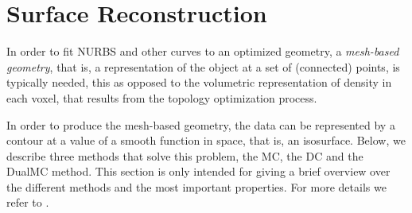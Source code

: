 \section{Surface Reconstruction}
\label{sec:surfaceBackg}
In order to fit \ac{NURBS} and other curves to an optimized geometry, a \emph{mesh-based geometry}, that is, a representation of the object at a set of (connected) points, is typically needed, this as opposed to the volumetric representation of density in each voxel, that results from the topology optimization process. 

In order to produce the mesh-based geometry, the data can be represented by a contour at a value of a smooth function in space, that is, an isosurface. Below, we describe three methods that solve this problem, the \ac{MC}, the \ac{DC} and the \ac{DualMC} method. This section is only intended for giving a brief overview over the different methods and the most important properties. For more details we refer to \cite{Marching2006, Hermite2002, Nielson2004}.





